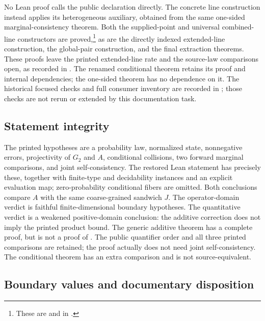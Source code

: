 \documentclass[11pt]{article}
\begin{document}
No Lean proof calls the public declaration 
directly. The concrete line construction instead applies its heterogeneous
auxiliary, obtained from the same one-sided marginal-consistency theorem.
Both the supplied-point and universal combined-line constructors are
proved,\footnote{These are
 and
 in
.}
as are the directly indexed extended-line construction, the global-pair
construction, and the final extraction theorems. These proofs leave the printed extended-line
rate and the source-law comparisons open, as recorded in
. The renamed
conditional theorem retains its proof and internal dependencies; the
one-sided theorem has no dependence on it. The historical focused checks
and full consumer inventory are recorded in
; those checks are not
rerun or extended by this documentation task.

\subsection*{Statement integrity}

The printed hypotheses are a probability law, normalized state, nonnegative
errors, projectivity of $G_2$ and $A$, conditional collisions, two forward
marginal comparisons, and joint self-consistency. The restored Lean statement
has precisely these, together with finite-type and decidability instances and
an explicit evaluation map; zero-probability conditional fibers are omitted.
Both conclusions compare $A$ with the same coarse-grained sandwich $J$.
The operator-domain verdict is faithful finite-dimensional boundary
hypotheses. The quantitative verdict is a weakened positive-domain
conclusion: the additive correction does not imply the printed product
bound. The generic additive theorem has a complete proof, but is not a
proof of . The public quantifier order and all three printed
comparisons are retained; the proof actually does not need joint
self-consistency.
The conditional theorem has an extra comparison and is not source-equivalent.

\subsection*{Boundary values and documentary disposition}
\end{document}
